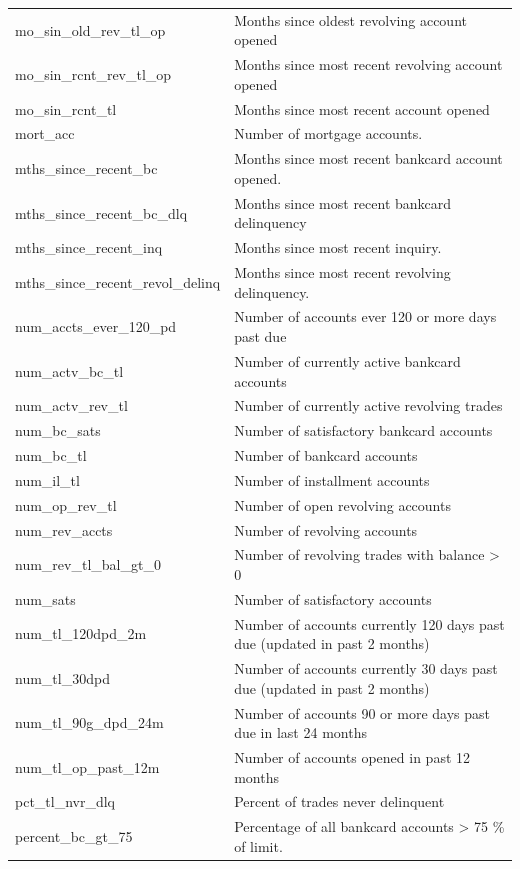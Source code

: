 \documentclass[11pt,]{report}
\begin{document}
\begin{longtable}[t]{>{\raggedright\arraybackslash}p{7cm}>{\raggedright\arraybackslash}p{7cm}}
mo\_sin\_old\_rev\_tl\_op & Months since oldest revolving account opened\\
\addlinespace
mo\_sin\_rcnt\_rev\_tl\_op & Months since most recent revolving account opened\\
mo\_sin\_rcnt\_tl & Months since most recent account opened\\
mort\_acc & Number of mortgage accounts.\\
mths\_since\_recent\_bc & Months since most recent bankcard account opened.\\
mths\_since\_recent\_bc\_dlq & Months since most recent bankcard delinquency\\
\addlinespace
mths\_since\_recent\_inq & Months since most recent inquiry.\\
mths\_since\_recent\_revol\_delinq & Months since most recent revolving delinquency.\\
num\_accts\_ever\_120\_pd & Number of accounts ever 120 or more days past due\\
num\_actv\_bc\_tl & Number of currently active bankcard accounts\\
num\_actv\_rev\_tl & Number of currently active revolving trades\\
\addlinespace
num\_bc\_sats & Number of satisfactory bankcard accounts\\
num\_bc\_tl & Number of bankcard accounts\\
num\_il\_tl & Number of installment accounts\\
num\_op\_rev\_tl & Number of open revolving accounts\\
num\_rev\_accts & Number of revolving accounts\\
\addlinespace
num\_rev\_tl\_bal\_gt\_0 & Number of revolving trades with balance >
    0\\
num\_sats & Number of satisfactory accounts\\
num\_tl\_120dpd\_2m & Number of accounts currently 120 days past due (updated in past 2 months)\\
num\_tl\_30dpd & Number of accounts currently 30 days past due (updated in past 2 months)\\
num\_tl\_90g\_dpd\_24m & Number of accounts 90 or more days past due in last 24 months\\
\addlinespace
num\_tl\_op\_past\_12m & Number of accounts opened in past 12 months\\
pct\_tl\_nvr\_dlq & Percent of trades never delinquent\\
percent\_bc\_gt\_75 & Percentage of all bankcard accounts > 75 \% of limit.\\

\end{longtable}
\end{document}
